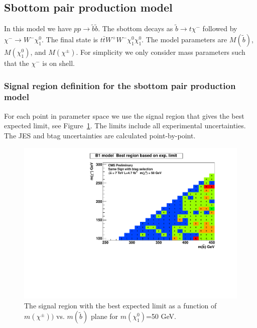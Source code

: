 \clearpage

\subsection{Sbottom pair production model}
\label{sec:sbottompair}
In this model we have $pp \to \tilde{b}\tilde{b}$.  The sbottom decays 
as $\tilde{b} \to t\chi^{-}$ followed by $\chi^{-} \to W^- \chi_1^0$. 
The final state is $t\bar{t}W^+W^- \chi_1^0 \chi_1^0$. 
The model parameters are $M(\widetilde{b})$, $M(\chi_1^0)$, and $M(\chi^{\pm})$.
For simplicity we only consider mass parameters such that the $\chi^{-}$ is on shell.

\subsubsection{Signal region definition for the sbottom pair production model}
\label{sec:sbottompairdefinition}
For each point in parameter space we use the signal region that gives
the best expected limit, see Figure~\ref{fig:sbottomoptimize}.
The limits include all experimental 
uncertainties.   The JES and btag uncertainties are calculated point-by-point.


\begin{figure}[htb]
\begin{center}
\includegraphics[width=0.5\linewidth]{figs/B1_BestSignalRegion.pdf}
\caption{The signal region with the best expected limit as a function of 
$m(\chi^{\pm}))$ vs. $m(\widetilde{b})$ plane for $m(\chi^0_1)$=50 GeV.
\label{fig:sbottomoptimize}}
\end{center}
\end{figure}


